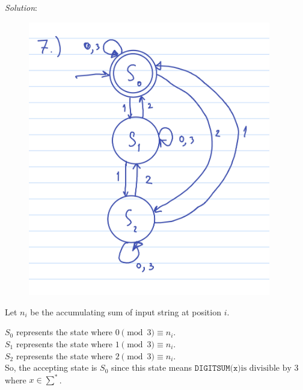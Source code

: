 \documentclass[a4paper, 11pt]{article}
\begin{document}
	{\em Solution}:
	\begin{figure}[htbp]
		\centering
		\includegraphics[width=400px]{figures/5.jpg}
	\end{figure}
	
	Let $n_i$ be the accumulating sum of input string at position $i$.
	
	$S_0$ represents the state where $0 \pmod{3} \equiv n_i$.\\
	$S_1$ represents the state where $1 \pmod{3} \equiv n_i$.\\
	$S_2$ represents the state where $2 \pmod{3} \equiv n_i$.\\
	
	So, the accepting state is $S_0$ since this state means $\texttt{DIGITSUM(x)} \text{is divisible by 3}$ where $x \in \sum^{*}$.
\end{document}
